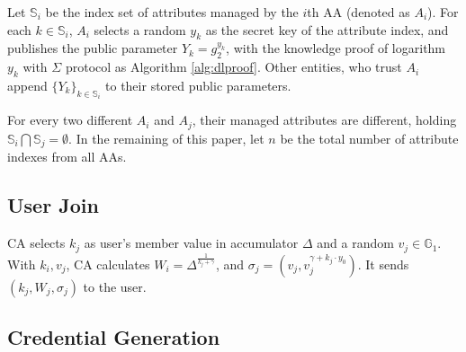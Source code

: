 \documentclass[journal]{IEEEtran}
\begin{document}
	Let $\mathbb{S}_i$ be the index set of attributes managed by the $i$th AA (denoted as $A_i$). For each $k\in \mathbb{S}_i$, $A_i$ selects a random $y_k$ as the secret key of the attribute index, and publishes the public parameter $Y_k = g_2^{y_k}$, with the knowledge proof of logarithm $y_k$ with $\Sigma$ protocol as Algorithm \ref{alg:dlproof}. 
	Other entities, who trust $A_i$ append $\{Y_k\}_{k\in \mathbb{S}_i}$ to their stored public parameters.
	
	For every two different $A_i$ and $A_j$, their managed attributes are different, holding $\mathbb{S}_i \bigcap \mathbb{S}_j = \emptyset$. In the remaining of this paper, let $n$ be the total number of attribute indexes from all AAs.
	\subsection{User Join}
	CA selects $k_j$ as user's member value in accumulator $\Delta$ and a random $v_j \in \mathbb{G}_1$. With $k_i, v_j$, CA calculates $W_i = \Delta^{\frac{1}{k_j + \gamma}}$, and $\sigma_j = (v_j, v_j^{\gamma+ k_j\cdot y_0})$. It sends $(k_j, W_j, \sigma_j)$ to the user. 
	
	\subsection{Credential Generation}
	
\end{document}
